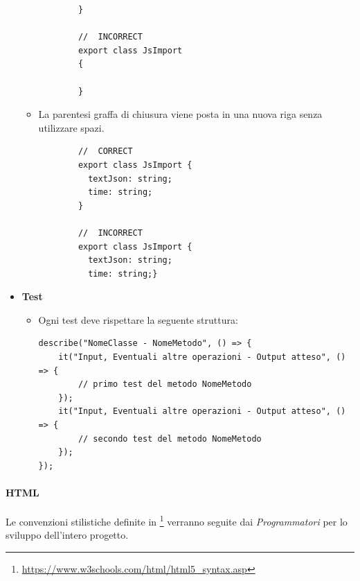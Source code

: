 \begin{itemize}
\begin{itemize}
\begin{lstlisting}
		}
		
		//  INCORRECT
		export class JsImport 
		{  
		
		}
		\end{lstlisting} 
		
		\item{La parentesi graffa di chiusura viene posta in una nuova riga senza utilizzare spazi.}
		\begin{lstlisting}
		//  CORRECT
		export class JsImport {  
		  textJson: string;
		  time: string;
		}
		
		//  INCORRECT
		export class JsImport {  
		  textJson: string;
		  time: string;}
		\end{lstlisting}		
		\end{itemize}
		\item{\textbf{Test}} 
		\begin{itemize}
			\item Ogni test deve rispettare la seguente struttura:
			\begin{lstlisting}
describe("NomeClasse - NomeMetodo", () => {
	it("Input, Eventuali altre operazioni - Output atteso", () => {
		// primo test del metodo NomeMetodo
	});
	it("Input, Eventuali altre operazioni - Output atteso", () => {
		// secondo test del metodo NomeMetodo
	});
});
			\end{lstlisting}
		\end{itemize}	
\end{itemize}

\paragraph{HTML}\Spazio
Le convenzioni stilistiche definite in \footnote{\url{https://www.w3schools.com/html/html5_syntax.asp}} verranno seguite dai \emph{Programmatori} per lo sviluppo dell'intero progetto.

